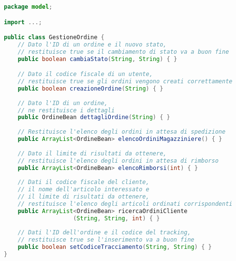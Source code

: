 \documentclass[12pt,a4paper]{article}
\begin{document}
\newpage

\begin{lstlisting}[language=Java]
package model;

import ...;

public class GestioneOrdine {
	// Dato l'ID di un ordine e il nuovo stato, 
	// restituisce true se il cambiamento di stato va a buon fine
	public boolean cambiaStato(String, String) { }

	// Dato il codice fiscale di un utente,
	// restituisce true se gli ordini vengono creati correttamente
	public boolean creazioneOrdine(String) { }
	
	// Dato l'ID di un ordine,
	// ne restituisce i dettagli
	public OrdineBean dettagliOrdine(String) { }
	
	// Restituisce l'elenco degli ordini in attesa di spedizione
	public ArrayList<OrdineBean> elencoOrdiniMagazziniere() { }
	
	// Dato il limite di risultati da ottenere,
	// restituisce l'elenco degli ordini in attesa di rimborso
	public ArrayList<OrdineBean> elencoRimborsi(int) { }
	
	// Dati il codice fiscale del cliente,
	// il nome dell'articolo interessato e 
	// il limite di risultati da ottenere,
	// restituisce l'elenco degli articoli ordinati corrispondenti
	public ArrayList<OrdineBean> ricercaOrdiniCliente
					(String, String, int) { }
	
	// Dati l'ID dell'ordine e il codice del tracking,
	// restituisce true se l'inserimento va a buon fine
	public boolean setCodiceTracciamento(String, String) { }
}
\end{lstlisting}

\newpage
\end{document}
